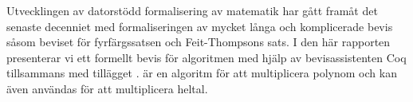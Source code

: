 Utvecklingen av datorstödd formalisering av matematik har gått framåt det
senaste decenniet med formaliseringen av mycket långa och komplicerade bevis
såsom beviset för fyrfärgssatsen och Feit-Thompsons sats. I den här rapporten
presenterar vi ett formellt bevis för algoritmen \toom med hjälp av
bevisassistenten Coq tillsammans med tillägget \ssr. \toom är en algoritm för
att multiplicera polynom och kan även användas för att multiplicera heltal.

